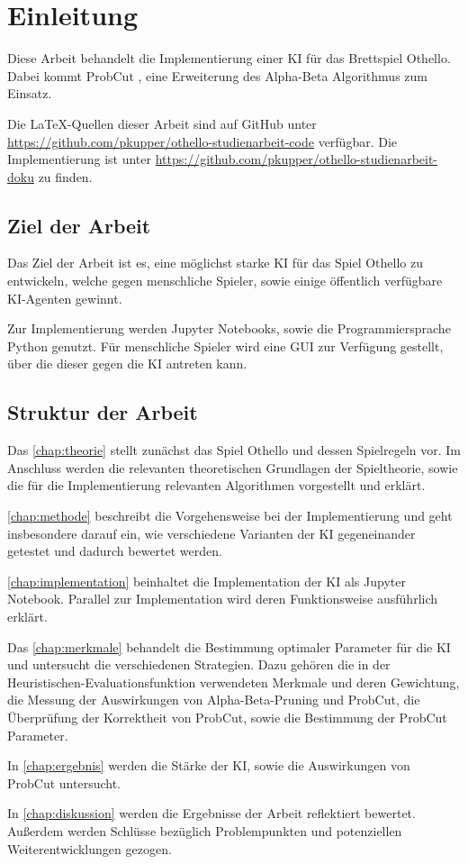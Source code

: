 
\chapter{Einleitung}
\label{chap:einleitung}

Diese Arbeit behandelt die Implementierung einer \ac{KI} für das Brettspiel Othello. Dabei kommt ProbCut
\cite[S.~1]{probcut}, eine Erweiterung des Alpha-Beta Algorithmus zum Einsatz.

Die \LaTeX-Quellen dieser Arbeit sind auf GitHub unter \url{https://github.com/pkupper/othello-studienarbeit-code}
verfügbar. Die Implementierung ist unter \url{https://github.com/pkupper/othello-studienarbeit-doku} zu finden.

\section{Ziel der Arbeit}
\label{sec:goal}

Das Ziel der Arbeit ist es, eine möglichst starke \ac{KI} für das Spiel Othello zu entwickeln, welche
gegen menschliche Spieler, sowie einige öffentlich verfügbare \ac{KI}-Agenten gewinnt.

Zur Implementierung werden Jupyter Notebooks, sowie die Programmiersprache Python genutzt.
Für menschliche Spieler wird eine \ac{GUI} zur Verfügung gestellt, über
die dieser gegen die \ac{KI} antreten kann.

\section{Struktur der Arbeit}
Das \autoref{chap:theorie} stellt zunächst das Spiel Othello und dessen Spielregeln vor. Im Anschluss werden die
relevanten theoretischen Grundlagen der Spieltheorie, sowie die für die Implementierung relevanten Algorithmen
vorgestellt und erklärt.

\autoref{chap:methode} beschreibt die Vorgehensweise bei der Implementierung und geht insbesondere darauf ein, wie
verschiedene Varianten der \ac{KI} gegeneinander getestet und dadurch bewertet werden.

\autoref{chap:implementation} beinhaltet die Implementation der \ac{KI} als Jupyter Notebook. Parallel
zur Implementation wird deren Funktionsweise ausführlich erklärt.

Das \autoref{chap:merkmale} behandelt die Bestimmung optimaler Parameter für die \ac{KI} und untersucht die
verschiedenen Strategien. Dazu gehören die in der Heuristischen-Evaluationsfunktion verwendeten Merkmale und deren
Gewichtung, die Messung der Auswirkungen von Alpha-Beta-Pruning und ProbCut, die Überprüfung der Korrektheit von
ProbCut, sowie die Bestimmung der ProbCut Parameter.

In \autoref{chap:ergebnis} werden die Stärke der \ac{KI}, sowie die Auswirkungen von ProbCut untersucht.

In \autoref{chap:diskussion} werden die Ergebnisse der Arbeit reflektiert bewertet. Außerdem werden Schlüsse bezüglich
Problempunkten und potenziellen Weiterentwicklungen gezogen.